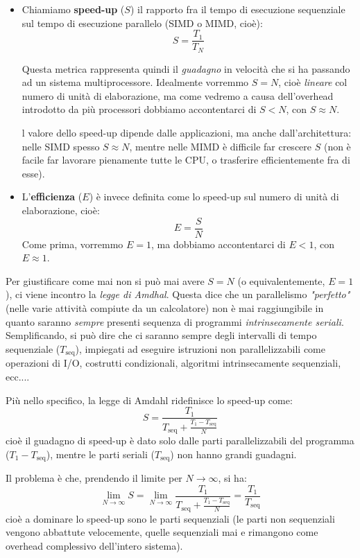 \documentclass[a4paper,11pt]{article}
\begin{document}
\begin{itemize}
	\item Chiamiamo \textbf{speed-up} ($S$) il rapporto fra il tempo di esecuzione sequenziale sul tempo di esecuzione parallelo (SIMD o MIMD, cioè):
		$$
			S = \frac{T_1}{T_N}
		$$

		Questa metrica rappresenta quindi il \textit{guadagno} in velocità che si ha passando ad un sistema multiprocessore. Idealmente vorremmo $S = N$, cioè \textit{lineare} col numero di unità di elaborazione, ma come vedremo a causa dell'overhead introdotto da più processori dobbiamo accontentarci di $S < N$, con $S \approx N$.

		l valore dello speed-up dipende dalle applicazioni, ma anche dall’architettura: nelle SIMD spesso $S \approx N$, mentre nelle MIMD è difficile far crescere $S$ (non è facile far lavorare pienamente tutte le CPU, o trasferire efficientemente fra di esse).

	\item L'\textbf{efficienza} ($E$) è invece definita come lo speed-up sul numero di unità di elaborazione, cioè:
		$$
			E = \frac{S}{N}
		$$
		Come prima, vorremmo $E = 1$, ma dobbiamo accontentarci di $E < 1$, con $E \approx 1$.
\end{itemize}

Per giustificare come mai non si può mai avere $S = N$ (o equivalentemente, $E = 1$), ci viene incontro la \textit{legge di Amdhal}.
Questa dice che un parallelismo \textit{"perfetto"} (nelle varie attività compiute da un calcolatore) non è mai raggiungibile in quanto saranno \textit{sempre} presenti sequenza di programmi \textit{intrinsecamente seriali}.
Semplificando, si può dire che ci saranno sempre degli intervalli di tempo sequenziale ($T_\text{seq}$), impiegati ad eseguire istruzioni non parallelizzabili come operazioni di I/O, costrutti condizionali, algoritmi intrinsecamente sequenziali, ecc....

Più nello specifico, la legge di Amdahl ridefinisce lo speed-up come:
$$
S = \frac{T_1}{T_{\text{seq}} + \frac{T_1 - T_\text{seq}}{N} }
$$
cioè il guadagno di speed-up è dato solo dalle parti parallelizzabili del programma ($T_1 - T_\text{seq}$), mentre le parti seriali ($T_\text{seq}$) non hanno grandi guadagni.

Il problema è che, prendendo il limite per $N \rightarrow \infty$, si ha:
$$
\lim_{N \rightarrow \infty} S = \lim_{N \rightarrow \infty} \frac{T_1}{T_{\text{seq}} + \frac{T_1 - T_\text{seq}}{N} } = \frac{T_1}{T_\text{seq}}
$$
cioè a dominare lo speed-up sono le parti sequenziali (le parti non sequenziali vengono abbattute velocemente, quelle sequenziali mai e rimangono come overhead complessivo dell'intero sistema).
\end{document}

